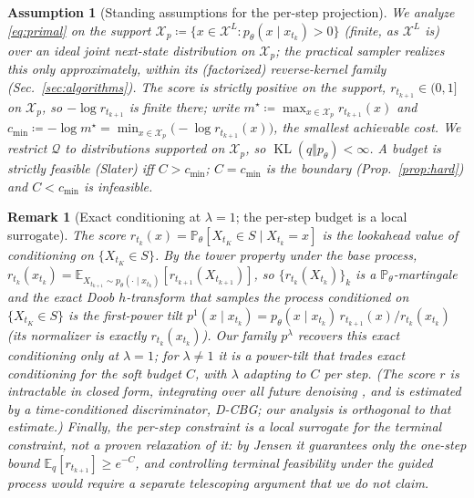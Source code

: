 \documentclass{article}
\newtheorem{assumption}{Assumption}
\newtheorem{remark}{Remark}
\DeclareMathOperator{\KL}{KL}
\newcommand{\E}{\mathbb{E}}
\newcommand{\X}{\mathcal{X}}
\newcommand{\Q}{\mathcal{Q}}
\begin{document}
\begin{assumption}[Standing assumptions for the per-step projection]
\label{ass:standing}
We analyze \eqref{eq:primal} on the support $\X_p\coloneqq\{x\in\X^L:p_\theta(x\mid x_{t_k})>0\}$ (finite, as $\X^L$ is) over an \emph{ideal joint} next-state distribution on $\X_p$; the practical sampler realizes this only approximately, within its (factorized) reverse-kernel family (Sec.~\ref{sec:algorithms}). The score is strictly positive on the support, $r_{t_{k+1}}\in(0,1]$ on $\X_p$, so $-\log r_{t_{k+1}}$ is finite there; write $m^\star\coloneqq\max_{x\in\X_p}r_{t_{k+1}}(x)$ and $c_{\min}\coloneqq-\log m^\star=\min_{x\in\X_p}\!\big(-\log r_{t_{k+1}}(x)\big)$, the smallest achievable cost. We restrict $\Q$ to distributions supported on $\X_p$, so $\KL(q\Vert p_\theta)<\infty$. A budget is \emph{strictly feasible} (Slater) iff $C>c_{\min}$; $C=c_{\min}$ is the boundary (Prop.~\ref{prop:hard}) and $C<c_{\min}$ is infeasible.
\end{assumption}

\begin{remark}[Exact conditioning at $\lambda{=}1$; the per-step budget is a local surrogate]
\label{rmk:myopic}
The score $r_{t_k}(x)=\mathbb P_\theta[X_{t_K}\in S\mid X_{t_k}=x]$ is the \emph{lookahead value} of conditioning on $\{X_{t_K}\in S\}$. By the tower property under the base process, $r_{t_k}(x_{t_k})=\E_{X_{t_{k+1}}\sim p_\theta(\cdot\mid x_{t_k})}[r_{t_{k+1}}(X_{t_{k+1}})]$, so $\{r_{t_k}(X_{t_k})\}_k$ is a $\mathbb P_\theta$-martingale and the exact Doob $h$-transform that samples the process conditioned on $\{X_{t_K}\in S\}$ is the \emph{first-power} tilt $p^{1}(x\mid x_{t_k})=p_\theta(x\mid x_{t_k})\,r_{t_{k+1}}(x)/r_{t_k}(x_{t_k})$ (its normalizer is exactly $r_{t_k}(x_{t_k})$). Our family $p^{\lambda}$ recovers this exact conditioning \emph{only} at $\lambda=1$; for $\lambda\neq1$ it is a power-tilt that trades exact conditioning for the soft budget $C$, with $\lambda$ adapting to $C$ per step. (The score $r$ is intractable in closed form, integrating over all future denoising \cite{wu2023practical,zhao2024probabilistic}, and is estimated by a time-conditioned discriminator, D-CBG; our analysis is orthogonal to that estimate.) Finally, the per-step constraint is a \emph{local surrogate} for the terminal constraint, not a proven relaxation of it: by Jensen it guarantees only the one-step bound $\E_{q}[r_{t_{k+1}}]\ge e^{-C}$, and controlling terminal feasibility under the \emph{guided} process would require a separate telescoping argument that we do not claim.
\end{remark}
\end{document}
